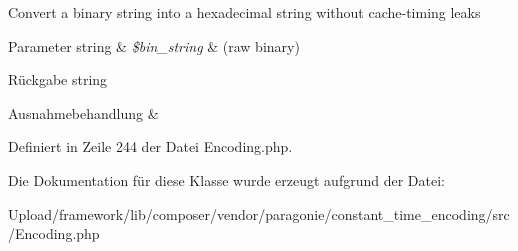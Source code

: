 Convert a binary string into a hexadecimal string without cache-\/timing leaks


\begin{DoxyParams}[1]{Parameter}
string & {\em \$bin\+\_\+string} & (raw binary) \\
\hline
\end{DoxyParams}
\begin{DoxyReturn}{Rückgabe}
string 
\end{DoxyReturn}

\begin{DoxyExceptions}{Ausnahmebehandlung}
{\em } & \\
\hline
\end{DoxyExceptions}


Definiert in Zeile 244 der Datei Encoding.\+php.



Die Dokumentation für diese Klasse wurde erzeugt aufgrund der Datei\+:\begin{DoxyCompactItemize}
\item 
Upload/framework/lib/composer/vendor/paragonie/constant\+\_\+time\+\_\+encoding/src/Encoding.\+php\end{DoxyCompactItemize}
